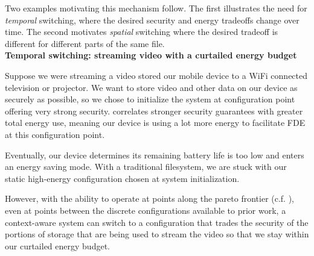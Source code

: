 Two examples motivating this mechanism follow. The first illustrates the need
for \emph{temporal} switching, where the desired security and energy tradeoffs
change over time.  The second motivates \emph{spatial} switching where the
desired tradeoff is different for different parts of the same file.\\


\noindent
\textbf{Temporal switching: streaming video with a curtailed energy budget}

 

  Suppose we were streaming a video stored our mobile
device to a WiFi connected television or projector. We want to store video and
other data on our device as securely as possible, so we chose to initialize the
system at configuration point offering very strong security.
 correlates stronger security guarantees with
greater total energy use, meaning our device is using a lot more energy to
facilitate FDE at this configuration point.

Eventually, our device determines its remaining battery life is too low and
enters an energy saving mode. With a traditional filesystem, we are stuck with
our static high-energy configuration chosen at system initialization.

However, with the ability to operate at points along the pareto frontier (c.f.
), even at points between the discrete
configurations available to prior work, a context-aware system can switch to a
configuration that trades the security of the portions of storage that are being
used to stream the video so that we stay within our curtailed energy budget.

